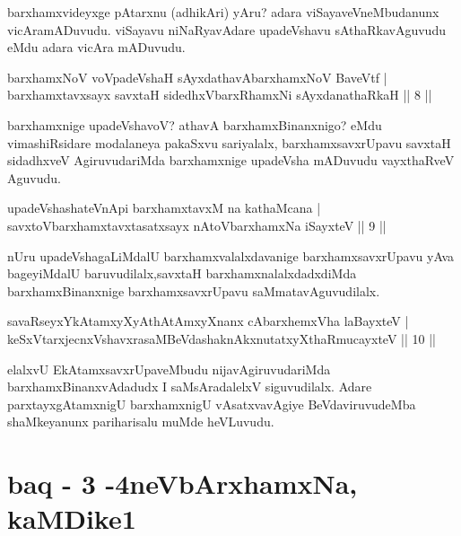 \begin{artha}
barxhamxvideyxge pAtarxnu (adhikAri) yAru? adara viSayaveVneMbudanunx vicAramADuvudu. viSayavu niNaRyavAdare upadeVshavu sAthaRkavAguvudu eMdu adara vicAra mADuvudu.
\end{artha}


\begin{shl}
barxhamxNoV voVpadeVshaH sAyxdathavA\s barxhamxNoV BaveVtf |\\
barxhamxtavxsayx savxtaH sidedhxVbarxRhamxNi sAyxdanathaRkaH \hfill || 8 ||
\end{shl}

\begin{artha}
barxhamxnige upadeVshavoV? athavA barxhamxBinanxnigo? eMdu vimashiRsidare modalaneya pakaSxvu sariyalalx, barxhamxsavxrUpavu savxtaH sidadhxveV AgiruvudariMda barxhamxnige upadeVsha mADuvudu vayxthaRveV Aguvudu.
\end{artha}


\begin{shl}
upadeVshashateVnApi barxhamxtavxM na kathaMcana |\\
savxtoV\s barxhamxtavxtasatxsayx nAtoV\s barxhamxNa iSayxteV \hfill || 9 ||
\end{shl}

\begin{artha}
nUru upadeVshagaLiMdalU barxhamxvalalxdavanige barxhamxsavxrUpavu yAva bageyiMdalU baruvudilalx,savxtaH barxhamxnalalxdadxdiMda barxhamxBinanxnige barxhamxsavxrUpavu saMmatavAguvudilalx.
\end{artha}

\begin{shl}
savaRseyxYkAtamxyXyAthAtAmxyXnanx cAbarxhemxVha laBayxteV |\\
keSxVtarxjecnxVshavxrasaMBeVdashaknAkxnutatxyXthaRmucayxteV \hfill || 10 ||
\end{shl}

\begin{artha}
elalxvU EkAtamxsavxrUpaveMbudu nijavAgiruvudariMda barxhamxBinanxvAdadudx I saMsAradalelxV siguvudilalx. Adare parxtayxgAtamxnigU barxhamxnigU vAsatxvavAgiye BeVdaviruvudeMba shaMkeyanunx pariharisalu muMde heVLuvudu.
\end{artha}

\section*{baq - 3 -4neVbArxhamxNa, kaMDike1}

